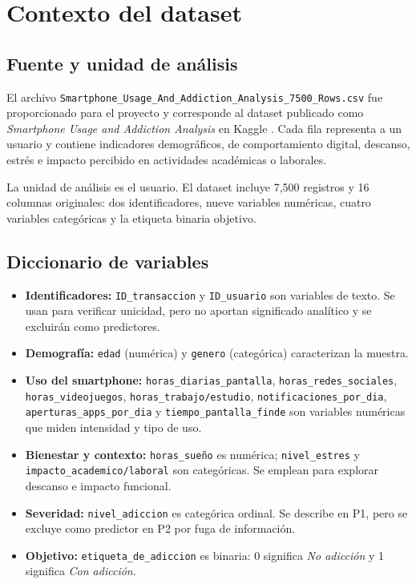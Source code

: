 \documentclass[11pt,spanish,a4paper,]{article}
\providecommand{\tightlist}{%
  \setlength{\itemsep}{0pt}\setlength{\parskip}{0pt}}
\begin{document}
\section{Contexto del dataset}\label{contexto-del-dataset}

\subsection{Fuente y unidad de
análisis}\label{fuente-y-unidad-de-anuxe1lisis}

El archivo
\texttt{Smartphone\_Usage\_And\_Addiction\_Analysis\_7500\_Rows.csv} fue
proporcionado para el proyecto y corresponde al dataset publicado como
\emph{Smartphone Usage and Addiction Analysis} en Kaggle
\textcite{KaggleDataset}. Cada fila representa a un usuario y contiene
indicadores demográficos, de comportamiento digital, descanso, estrés e
impacto percibido en actividades académicas o laborales.

La unidad de análisis es el usuario. El dataset incluye 7,500 registros
y 16 columnas originales: dos identificadores, nueve variables
numéricas, cuatro variables categóricas y la etiqueta binaria objetivo.

\subsection{Diccionario de variables}\label{diccionario-de-variables}

\begin{itemize}
\tightlist
\item
  \textbf{Identificadores:} \texttt{ID\_transaccion} y
  \texttt{ID\_usuario} son variables de texto. Se usan para verificar
  unicidad, pero no aportan significado analítico y se excluirán como
  predictores.
\item
  \textbf{Demografía:} \texttt{edad} (numérica) y \texttt{genero}
  (categórica) caracterizan la muestra.
\item
  \textbf{Uso del smartphone:} \texttt{horas\_diarias\_pantalla},
  \texttt{horas\_redes\_sociales}, \texttt{horas\_videojuegos},
  \texttt{horas\_trabajo/estudio}, \texttt{notificaciones\_por\_dia},
  \texttt{aperturas\_apps\_por\_dia} y \texttt{tiempo\_pantalla\_finde}
  son variables numéricas que miden intensidad y tipo de uso.
\item
  \textbf{Bienestar y contexto:} \texttt{horas\_sueño} es numérica;
  \texttt{nivel\_estres} y \texttt{impacto\_academico/laboral} son
  categóricas. Se emplean para explorar descanso e impacto funcional.
\item
  \textbf{Severidad:} \texttt{nivel\_adiccion} es categórica ordinal. Se
  describe en P1, pero se excluye como predictor en P2 por fuga de
  información.
\item
  \textbf{Objetivo:} \texttt{etiqueta\_de\_adiccion} es binaria: 0
  significa \emph{No adicción} y 1 significa \emph{Con adicción}.
\end{itemize}
\end{document}
